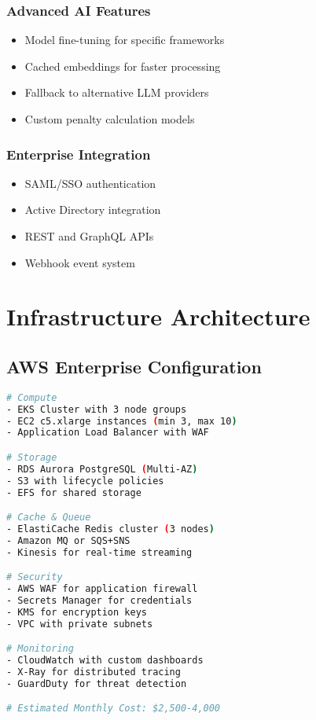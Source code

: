\documentclass[12pt,a4paper]{report}
\begin{document}
\subsubsection{Advanced AI Features}
\begin{itemize}
    \item Model fine-tuning for specific frameworks
    \item Cached embeddings for faster processing
    \item Fallback to alternative LLM providers
    \item Custom penalty calculation models
\end{itemize}

\subsubsection{Enterprise Integration}
\begin{itemize}
    \item SAML/SSO authentication
    \item Active Directory integration
    \item REST and GraphQL APIs
    \item Webhook event system
\end{itemize}

\section{Infrastructure Architecture}

\subsection{AWS Enterprise Configuration}

\begin{lstlisting}[language=bash, caption=AWS Enterprise Infrastructure]
# Compute
- EKS Cluster with 3 node groups
- EC2 c5.xlarge instances (min 3, max 10)
- Application Load Balancer with WAF

# Storage
- RDS Aurora PostgreSQL (Multi-AZ)
- S3 with lifecycle policies
- EFS for shared storage

# Cache & Queue
- ElastiCache Redis cluster (3 nodes)
- Amazon MQ or SQS+SNS
- Kinesis for real-time streaming

# Security
- AWS WAF for application firewall
- Secrets Manager for credentials
- KMS for encryption keys
- VPC with private subnets

# Monitoring
- CloudWatch with custom dashboards
- X-Ray for distributed tracing
- GuardDuty for threat detection

# Estimated Monthly Cost: $2,500-4,000
\end{lstlisting}
\end{document}
